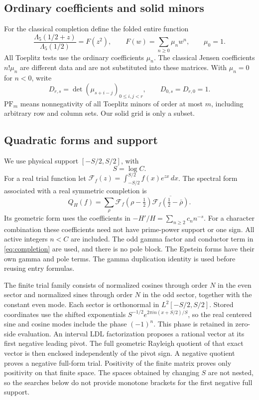 \documentclass[11pt]{article}
\theoremstyle{remark}
\newcommand{\PF}{\mathrm{PF}}
\begin{document}
\subsection{Ordinary coefficients and solid minors}
For the classical completion define the folded entire function
\begin{equation}\label{eq:fold}
 \frac{\Lambda_5(1/2+z)}{\Lambda_5(1/2)}
       =F(z^2),\qquad F(w)=\sum_{n\ge0}\mu_n w^n,\qquad \mu_0=1.
\end{equation}
All Toeplitz tests use the ordinary coefficients \(\mu_n\).
The classical Jensen coefficients \(n!\mu_n\) are different data and are
not substituted into these matrices. With \(\mu_n=0\) for \(n<0\), write
\begin{equation}\label{eq:solid}
 D_{r,s}=\det(\mu_{s+i-j})_{0\le i,j<r},
 \qquad D_{0,s}=D_{r,0}=1.
\end{equation}
\(\PF_m\) means nonnegativity of all Toeplitz minors of order at most \(m\),
including arbitrary row and column sets. Our solid grid is only a subset.

\subsection{Quadratic forms and support}
We use physical support \([-S/2,S/2]\), with
\begin{equation}\label{eq:support}
 S=\log C.
\end{equation}
For a real trial function let
\(\mathcal F_f(z)=\int_{-S/2}^{S/2}f(x)e^{zx}\,dx\).
The spectral form associated with a real symmetric completion is
\begin{equation}\label{eq:spectral}
 Q_H(f)=\sum_\rho \mathcal F_f(\rho-\tfrac12)
                  \overline{\mathcal F_f(\tfrac12-\bar\rho)}.
\end{equation}
Its geometric form uses the coefficients in
\(-H'/H=\sum_{n\ge2}c_n n^{-s}\).
For a character combination these coefficients need not have prime-power
support or one sign. All active integers \(n<C\) are included.
The odd gamma factor and conductor term in \eqref{eq:completion} are used,
and there is no pole block. The Epstein forms have their own gamma and pole
terms. The gamma duplication identity is used before reusing entry formulas.

The finite trial family consists of normalized cosines through order \(N\)
in the even sector and normalized sines through order \(N\) in the odd
sector, together with the constant even mode. Each sector is orthonormal in
\(L^2[-S/2,S/2]\). Stored coordinates use the shifted exponentials
\(S^{-1/2}e^{2\pi i n(x+S/2)/S}\), so the real centered sine and cosine modes
include the phase \((-1)^n\). This phase is retained in zero-side evaluation.
An interval LDL factorization proposes a rational vector at
its first negative leading pivot. The full geometric Rayleigh quotient of
that exact vector is then enclosed independently of the pivot sign.
A negative quotient proves a negative full-form trial.
Positivity of the finite matrix proves only positivity on that finite space.
The spaces obtained by changing \(S\) are not nested, so the searches below
do not provide monotone brackets for the first negative full support.
\end{document}
